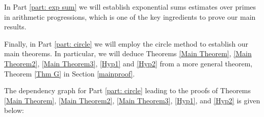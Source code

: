 \documentclass[12pt]{amsart}
\numberwithin{equation}{section}
\theoremstyle{remark}
\theoremstyle{definition}
\begin{document}
\medskip

In Part \ref{part: exp sum} we will establish exponential sums estimates over primes in arithmetic progressions, which is one of the key ingredients to prove our main results.

Finally, in Part \ref{part: circle} we will employ the circle method to establish our main theorems. In particular, we will deduce Theorems \ref{Main Theorem}, \ref{Main Theorem2}, \ref{Main Theorem3}, \ref{Hyp1} and \ref{Hyp2} from a more general theorem, Theorem \ref{Thm G} in Section \ref{mainproof}.


The dependency graph for Part \ref{part: circle} leading to the proofs of Theorems \ref{Main Theorem}, \ref{Main Theorem2}, \ref{Main Theorem3}, \ref{Hyp1}, and \ref{Hyp2} is given below:


		
		
	
\end{document}
